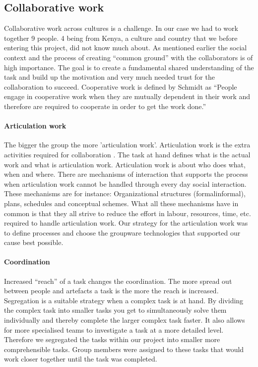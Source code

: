 \subsection{Collaborative work} \label{sub:collaborativework}
Collaborative work across cultures is a challenge. In our case we had to work together 9 people. 4 being from Kenya, a culture and country that we before entering this project, did not know much about. As mentioned earlier the social context and the process of creating ``common ground'' with the collaborators is of high importance. The goal is to create a fundamental shared understanding of the task and build up the motivation and very much needed trust for the collaboration to succeed. Cooperative work is defined by Schmidt as ``People engage in cooperative work when they are mutually dependent in their work and therefore are required to cooperate in order to get the work done.'' \cite{schmidt1992taking}

\paragraph{Articulation work} \label{par:articulationwork}
The bigger the group the more 'articulation work'. Articulation work is the extra activities required for collaboration \cite{schmidt1992taking}. The task at hand defines what is the actual work and what is articulation work. Articulation work is about who does what, when and where. There are mechanisms of interaction that supports the process when articulation work cannot be handled through every day social interaction. These mechanisms are for instance: Organizational structures (formal\/informal), plans, schedules and conceptual schemes. What all these mechanisms have in common is that they all strive to reduce the effort in labour, resources, time, etc. required to handle articulation work. Our strategy for the articulation work was to define processes and choose the groupware technologies that supported our cause best possible. 

\paragraph{Coordination} \label{par:coordination}
Increased ``reach'' of a task changes the coordination. The more spread out between people and artefacts a task is the more the reach is increased. Segregation is a suitable strategy when a complex task is at hand. By dividing the complex task into smaller tasks you get to simultaneously solve them individually and thereby complete the larger complex task faster. It also allows for more specialised teams to investigate a task at a more detailed level. Therefore we segregated the tasks within our project into smaller more comprehensible tasks. Group members were assigned to these tasks that would work closer together until the task was completed. 

